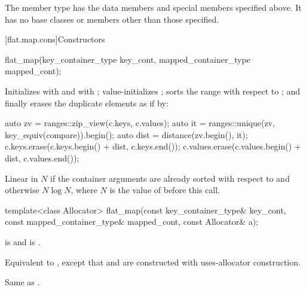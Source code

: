 \pnum
The member type  has the data members and special members
specified above.
It has no base classes or members other than those specified.

[flat.map.cons]{Constructors}

%
\begin{itemdecl}
flat_map(key_container_type key_cont, mapped_container_type mapped_cont);
\end{itemdecl}

\begin{itemdescr}
\pnum
\effects
Initializes  with  and
 with ;
value-initializes ;
sorts the range  with respect to ; and
finally erases the duplicate elements as if by:
\begin{codeblock}
auto zv = ranges::zip_view(c.keys, c.values);
auto it = ranges::unique(zv, key_equiv(compare)).begin();
auto dist = distance(zv.begin(), it);
c.keys.erase(c.keys.begin() + dist, c.keys.end());
c.values.erase(c.values.begin() + dist, c.values.end());
\end{codeblock}

\pnum
\complexity
Linear in $N$ if the container arguments are already sorted
with respect to  and otherwise $N \log N$,
where $N$ is the value of  before this call.
\end{itemdescr}

%
\begin{itemdecl}
template<class Allocator>
  flat_map(const key_container_type& key_cont, const mapped_container_type& mapped_cont,
           const Allocator& a);
\end{itemdecl}

\begin{itemdescr}
\pnum
\constraints
{} is  and
 is .

\pnum
\effects
Equivalent to ,
except that  and  are constructed with
uses-allocator construction.

\pnum
\complexity
Same as .
\end{itemdescr}

